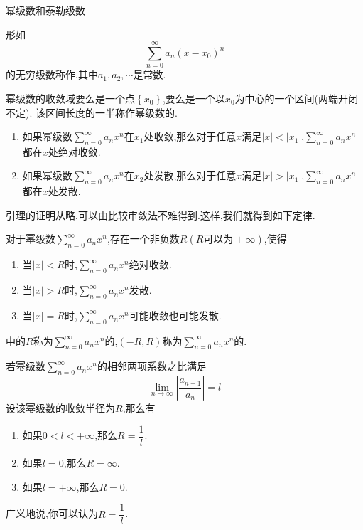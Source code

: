 \documentclass{ctexart}
\begin{document}
\pagestyle{empty}
\begin{center}\large 幂级数和泰勒级数\end{center}
\begin{definition}[1.1 定义:幂级数]
    形如
    \[\sum_{n=0}^\infty a_n\left(x-x_0\right)^n\]
    的无穷级数称作.其中$a_1,a_2,\cdots$是常数.
\end{definition}
\begin{formal}[1.2 幂级数的收敛半径]
    幂级数的收敛域要么是一个点$\left\{x_0\right\}$,要么是一个以$x_0$为中心的一个区间(两端开闭不定).%
    该区间长度的一半称作幂级数的.
\end{formal}
\begin{lemma}
    \begin{enumerate}[label=\tbf{\arabic*.}]
        \item 如果幂级数$\displaystyle\sum_{n=0}^\infty a_nx^n$在$x_1$处收敛,那么对于任意$x$满足$|x|<|x_1|$,$\displaystyle\sum_{n=0}^\infty a_nx^n$都在$x$处绝对收敛.
        \item 如果幂级数$\displaystyle\sum_{n=0}^\infty a_nx^n$在$x_2$处发散,那么对于任意$x$满足$|x|>|x_1|$,$\displaystyle\sum_{n=0}^\infty a_nx^n$都在$x$处发散.
    \end{enumerate}
\end{lemma}\noindent
引理的证明从略,可以由比较审敛法不难得到.这样,我们就得到如下定律.
\begin{formal}[1.3 幂级数的收敛半径]
    对于幂级数$\displaystyle\sum_{n=0}^\infty a_nx^n$,存在一个非负数$R(R\text{可以为}+\infty)$,使得
    \begin{enumerate}[label=\tbf{\arabic*.}]
        \item 当$|x|<R$时,$\displaystyle\sum_{n=0}^\infty a_nx^n$绝对收敛.
        \item 当$|x|>R$时,$\displaystyle\sum_{n=0}^\infty a_nx^n$发散.
        \item 当$|x|=R$时,$\displaystyle\sum_{n=0}^\infty a_nx^n$可能收敛也可能发散.
    \end{enumerate}
\end{formal}
\begin{definition}[1.4 幂级数的收敛半径与收敛区间]
    中的$R$称为$\displaystyle\sum_{n=0}^\infty a_nx^n$的,$(-R,R)$称为$\displaystyle\sum_{n=0}^\infty a_nx^n$的.
\end{definition}\noindent
{}
\begin{formal}
    若幂级数$\displaystyle\sum_{n=0}^\infty a_nx^n$的相邻两项系数之比满足
    \[\lim_{n\to\infty}\left|\dfrac{a_{n+1}}{a_n}\right|=l\]
    设该幂级数的收敛半径为$R$,那么有
    \begin{enumerate}[label=\tbf{\arabic*.}]
        \item 如果$0<l<+\infty$,那么$R=\dfrac1l$.
        \item 如果$l=0$,那么$R=\infty$.
        \item 如果$l=+\infty$,那么$R=0$.
    \end{enumerate}
    广义地说,你可以认为$R=\dfrac1l$.
\end{formal}
\end{document}

